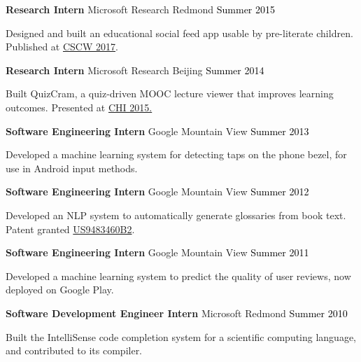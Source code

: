 \documentclass[10pt,A4]{article}
\newcommand{\cvevtone}[4]
{

	\textbf{#2} \hspace{1mm} \textcolor{bgcol}{#3} \hfill \vspace{2.5pt}\textcolor{black}{#1}

\vspace{-8pt}
\vspace{6pt}

  #4\\[3pt]

}
\begin{document}
\vspace{-1mm}


%
\cvevtone{Summer 2015}{Research Intern}{\textcolor{sectcol}{Microsoft Research} \hspace{1mm} Redmond}{Designed and built an educational social feed app usable by pre-literate children. Published at \href{https://www.microsoft.com/en-us/research/wp-content/uploads/2016/10/edufeed.pdf}{CSCW 2017}.} %

\vspace{-1mm}


\cvevtone{Summer 2014}{Research Intern}{\textcolor{sectcol}{Microsoft Research} \hspace{1mm} Beijing}{Built QuizCram, a quiz-driven MOOC lecture viewer that improves learning outcomes. Presented at \href{https://hci.stanford.edu/publications/2015/quizcram/quizcram-chi2015.pdf}{CHI 2015.}} %

\vspace{-1mm}


\cvevtone{Summer 2013}{Software Engineering Intern}{\textcolor{sectcol}{Google} \hspace{1mm} Mountain View}{Developed a machine learning system for detecting taps on the phone bezel, for use in Android input methods.} %

\vspace{-1mm}


\cvevtone{Summer 2012}{Software Engineering Intern}{\textcolor{sectcol}{Google} \hspace{1mm} Mountain View}{Developed an NLP system to automatically generate glossaries from book text. Patent granted \href{https://patents.google.com/patent/US9483460B2}{US9483460B2}.} %

\vspace{-1mm}


\cvevtone{Summer 2011}{Software Engineering Intern}{\textcolor{sectcol}{Google} \hspace{1mm} Mountain View}{Developed a machine learning system to predict the quality of user reviews, now deployed on Google Play.} %

\vspace{-1mm}


\cvevtone{Summer 2010}{Software Development Engineer Intern}{\textcolor{sectcol}{Microsoft} \hspace{1mm} Redmond}{Built the IntelliSense code completion system for a scientific computing language, and contributed to its compiler.} %
\end{document}
